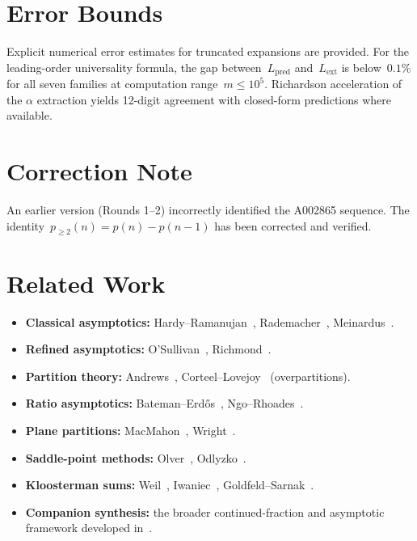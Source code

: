 \documentclass[11pt,a4paper]{article}
\begin{document}
\section{Error Bounds}\label{sec:errors}

Explicit numerical error estimates for truncated expansions are provided. For the leading-order universality formula, the gap between~$L_{\mathrm{pred}}$ and~$L_{\mathrm{ext}}$ is below~$0.1\%$ for all seven families at computation range~$m \leq 10^5$. Richardson acceleration of the $\alpha$ extraction yields 12-digit agreement with closed-form predictions where available.

\section{Correction Note}\label{sec:correction}

An earlier version (Rounds 1--2) incorrectly identified the A002865 sequence. The identity~$p_{\geq 2}(n) = p(n) - p(n-1)$ has been corrected and verified.

\section{Related Work}\label{sec:related}

\begin{itemize}
  \item \textbf{Classical asymptotics:} Hardy--Ramanujan~\cite{hardy1918}, Rademacher~\cite{rademacher1937}, Meinardus~\cite{meinardus1954}.
  \item \textbf{Refined asymptotics:} O'Sullivan~\cite{osullivan2015}, Richmond~\cite{richmond1975}.
  \item \textbf{Partition theory:} Andrews~\cite{andrews1976}, Corteel--Lovejoy~\cite{corteel2004} (overpartitions).
  \item \textbf{Ratio asymptotics:} Bateman--Erd\H{o}s~\cite{bateman1956}, Ngo--Rhoades~\cite{ngo2017}.
  \item \textbf{Plane partitions:} MacMahon~\cite{macmahon1912}, Wright~\cite{wright1931,wright1934}.
  \item \textbf{Saddle-point methods:} Olver~\cite{olver1974}, Odlyzko~\cite{odlyzko1995}.
  \item \textbf{Kloosterman sums:} Weil~\cite{Weil1948}, Iwaniec~\cite{Iwaniec1997}, Goldfeld--Sarnak~\cite{goldfeld1983}.
  \item \textbf{Companion synthesis:} the broader continued-fraction and asymptotic framework developed in~\cite{pcf_unified}.
\end{itemize}
\end{document}
